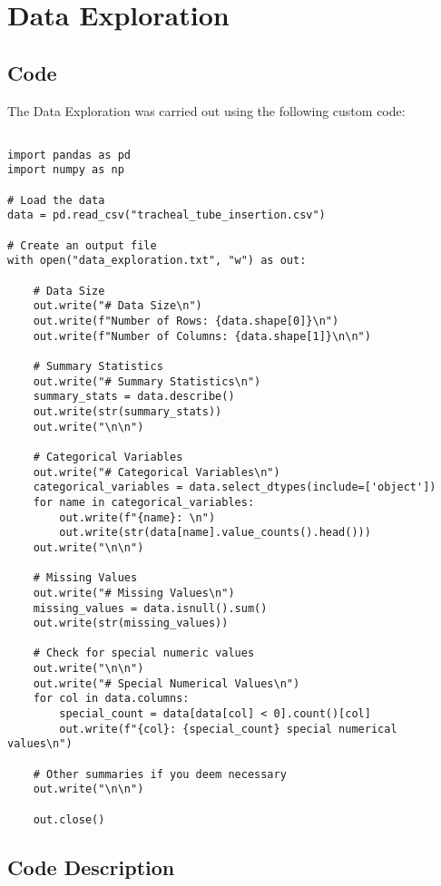 \documentclass[11pt]{article}
\begin{document}
\section{Data Exploration}
\subsection{{Code}}
The Data Exploration was carried out using the following custom code:

\begin{verbatim}

import pandas as pd
import numpy as np

# Load the data
data = pd.read_csv("tracheal_tube_insertion.csv")

# Create an output file
with open("data_exploration.txt", "w") as out:

    # Data Size
    out.write("# Data Size\n")
    out.write(f"Number of Rows: {data.shape[0]}\n")
    out.write(f"Number of Columns: {data.shape[1]}\n\n")
    
    # Summary Statistics
    out.write("# Summary Statistics\n")
    summary_stats = data.describe()
    out.write(str(summary_stats))
    out.write("\n\n")

    # Categorical Variables
    out.write("# Categorical Variables\n")
    categorical_variables = data.select_dtypes(include=['object'])
    for name in categorical_variables:
        out.write(f"{name}: \n")
        out.write(str(data[name].value_counts().head()))
    out.write("\n\n")

    # Missing Values
    out.write("# Missing Values\n")
    missing_values = data.isnull().sum()
    out.write(str(missing_values))
    
    # Check for special numeric values
    out.write("\n\n")
    out.write("# Special Numerical Values\n")
    for col in data.columns:
        special_count = data[data[col] < 0].count()[col]
        out.write(f"{col}: {special_count} special numerical values\n")

    # Other summaries if you deem necessary
    out.write("\n\n")
    
    out.close()

\end{verbatim}

\subsection{Code Description}
\end{document}
